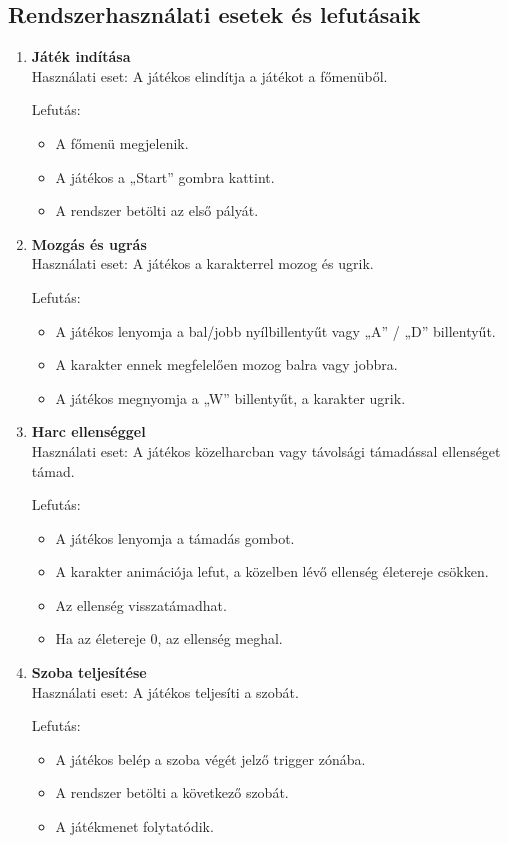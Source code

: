 \documentclass[
]{thesis-ekf}
\theoremstyle{definition}
\theoremstyle{remark}
\begin{document}
\subsection{Rendszerhasználati esetek és lefutásaik}
\begin{enumerate}
	\item \textbf{Játék indítása} \\
	Használati eset: A játékos elindítja a játékot a főmenüből.
	
	Lefutás:
	\begin{itemize}
		\item A főmenü megjelenik.
		\item A játékos a „Start” gombra kattint.
		\item A rendszer betölti az első pályát.
	\end{itemize}
	
	\item \textbf{Mozgás és ugrás} \\
	Használati eset: A játékos a karakterrel mozog és ugrik.
	
	Lefutás:
	\begin{itemize}
		\item A játékos lenyomja a bal/jobb nyílbillentyűt vagy „A” / „D” billentyűt.
		\item A karakter ennek megfelelően mozog balra vagy jobbra.
		\item A játékos megnyomja a „W” billentyűt, a karakter ugrik.
	\end{itemize}
	
	\item \textbf{Harc ellenséggel} \\
	Használati eset: A játékos közelharcban vagy távolsági támadással ellenséget támad.
	
	Lefutás:
	\begin{itemize}
		\item A játékos lenyomja a támadás gombot.
		\item A karakter animációja lefut, a közelben lévő ellenség életereje csökken.
		\item Az ellenség visszatámadhat.
		\item Ha az életereje 0, az ellenség meghal.
	\end{itemize}
	
	\item \textbf{Szoba teljesítése} \\
	Használati eset: A játékos teljesíti a szobát.
	
	Lefutás:
	\begin{itemize}
		\item A játékos belép a szoba végét jelző trigger zónába.
		\item A rendszer betölti a következő szobát.
		\item A játékmenet folytatódik.
	\end{itemize}
\end{enumerate}
\end{document}
